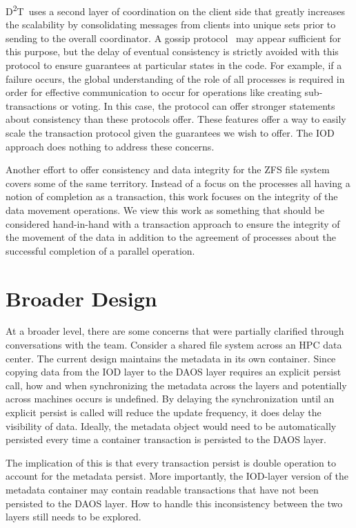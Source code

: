 \documentclass[conference]{sig-alt-gov2}
\newcommand{\DDT}{D\textsuperscript{2}T~}
\begin{document}
\DDT uses a second layer of coordination on the client side that greatly
increases the scalability by consolidating messages from clients into unique
sets prior to sending to the overall coordinator. A gossip
protocol~\cite{ganesh:2003:gossip-protocols} may appear sufficient for this
purpose, but the delay of eventual consistency is strictly avoided with this
protocol to ensure guarantees at particular states in the code. For example, if
a failure occurs, the global understanding of the role of all processes is
required in order for effective communication to occur for operations like
creating sub-transactions or voting. In this case, the protocol can offer
stronger statements about consistency than these protocols offer.  These
features offer a way to easily scale the transaction protocol given the
guarantees we wish to offer. The IOD approach does nothing to address these
concerns.

Another effort to offer consistency and data integrity for the ZFS file
system~\cite{zhang:2010:zfs} covers some of the same territory. Instead of a
focus on the processes all having a notion of completion as a transaction, this
work focuses on the integrity of the data movement operations. We view this
work as something that should be considered hand-in-hand with a transaction
approach to ensure the integrity of the movement of the data in addition to the
agreement of processes about the successful completion of a parallel operation.

\section{Broader Design}
\label{sec:summary}

At a broader level, there are some concerns that were partially clarified
through conversations with the team.  Consider a shared file system across an
HPC data center. The current design maintains the metadata in its own
container. Since copying data from the IOD layer to the DAOS layer requires an
explicit persist call, how and when synchronizing the metadata across the 
layers and potentially across machines occurs is undefined. By delaying the
synchronization until an explicit persist is called will reduce the update
frequency, it does delay the visibility of data. Ideally, the metadata object
would need to be automatically persisted every time a container transaction is
persisted to the DAOS layer.

The implication of this is that every transaction persist is double operation
to account for the metadata persist. More importantly, the IOD-layer version of
the metadata container may contain readable transactions that have not been
persisted to the DAOS layer. How to handle this inconsistency between the two
layers still needs to be explored.
\end{document}
